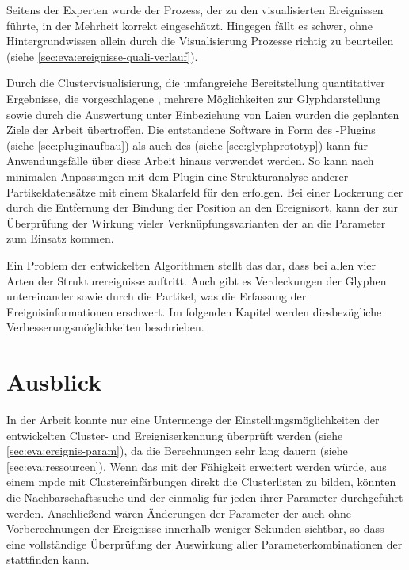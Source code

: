 Seitens der Experten wurde der Prozess, der zu den visualisierten Ereignissen führte, in der Mehrheit korrekt eingeschätzt. Hingegen fällt es schwer, ohne Hintergrundwissen allein durch die Visualisierung Prozesse richtig zu beurteilen (siehe \autoref{sec:eva:ereignisse-quali-verlauf}).

Durch die Clustervisualisierung, die umfangreiche Bereitstellung quantitativer Ergebnisse, die vorgeschlagene , mehrere Möglichkeiten zur Glyphdarstellung sowie durch die Auswertung unter Einbeziehung von Laien wurden die geplanten Ziele der Arbeit übertroffen. Die entstandene Software in Form des -Plugins (siehe \autoref{sec:pluginaufbau}) als auch des  (siehe \autoref{sec:glyphprototyp}) kann für Anwendungsfälle über diese Arbeit hinaus verwendet werden. So kann nach minimalen Anpassungen mit dem Plugin eine Strukturanalyse anderer Partikeldatensätze mit einem Skalarfeld für den  erfolgen. Bei einer Lockerung der  durch die Entfernung der Bindung der Position an den Ereignisort, kann der  zur Überprüfung der Wirkung vieler Verknüpfungsvarianten der  an die Parameter zum Einsatz kommen.

Ein Problem der entwickelten Algorithmen stellt das  dar, dass bei allen vier Arten der Strukturereignisse auftritt.
Auch gibt es Verdeckungen der Glyphen untereinander sowie durch die Partikel, was die Erfassung der Ereignisinformationen erschwert. Im folgenden Kapitel werden diesbezügliche Verbesserungsmöglichkeiten beschrieben.


\chapter{Ausblick}\label{sec:ausblick}
In der Arbeit konnte nur eine Untermenge der Einstellungsmöglichkeiten der entwickelten Cluster- und Ereigniserkennung überprüft werden (siehe \autoref{sec:eva:ereignis-param}), da die Berechnungen sehr lang dauern (siehe \autoref{sec:eva:ressourcen}). Wenn das \SECalc mit der Fähigkeit erweitert werden würde, aus einem \gls{mpdc} mit Clustereinfärbungen direkt die Clusterlisten zu bilden, könnten die Nachbarschaftssuche und der \CFD einmalig für jeden ihrer Parameter durchgeführt werden. Anschließend wären Änderungen der Parameter der  auch ohne Vorberechnungen der Ereignisse innerhalb weniger Sekunden sichtbar, so dass eine vollständige Überprüfung der Auswirkung aller Parameterkombinationen der  stattfinden kann.

